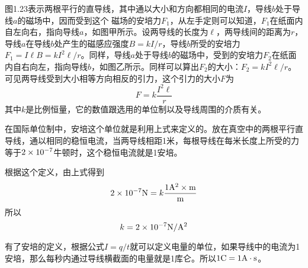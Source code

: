 图1.23表示两根平行的直导线，其中通以大小和方向都相同的电流$I$，导线$b$处于导线$a$的磁场中，因而受到这个
磁场的安培力$F_1$，从左手定则可以知道，$F_1$在纸面内自左向右，指向导线$a$，如图甲所示。设两导线的长度为$\ell$，两导线间的距离为$r$，导线$a$在导线$b$处产生的磁感应强度$B=kI/r$，导线$b$所受的安培力$F_1=I\ell B=kI^2\ell/r$。同样，导线$a$处于导线$b$的磁场中，受到的安培力$F_2$在纸面内自右向左，指向导线$b$，如图乙所示。同样可以算出$F_2$的大小：$F_2=kI^2\ell/r$。可见两导线受到大小相等方向相反的引力，这个引力的大小$F$为
\[F=k\frac{I^2\ell}{r}\]
其中$k$是比例恒量，它的数值跟选用的单位制以及导线周围的介质有关。

在国际单位制中，安培这个单位就是利用上式来定义的。放在真空中的两根平行直导线，通以相同的稳恒电流，当两导线相距1米，每根导线在每米长度上所受的力等于$2\times10^{-7}$牛顿时，这个稳恒电流就是1安培。

根据这个定义，由上式得到
\[ 2\times10^{-7} {\rm N}=k\frac{1{\rm A^2}\times {\rm m}}{\rm m}\]
所以
\[k=2\times10^{-7}{{\rm N}/{\rm A^2}}\]

有了安培的定义，根据公式$I=q/t$就可以定义电量的单位，如果导线中的电流为1安培，那么每秒内通过导线横截面的电量就是1库仑。所以$1{\rm C}=1{\rm A}\cdot {\rm s}$。

